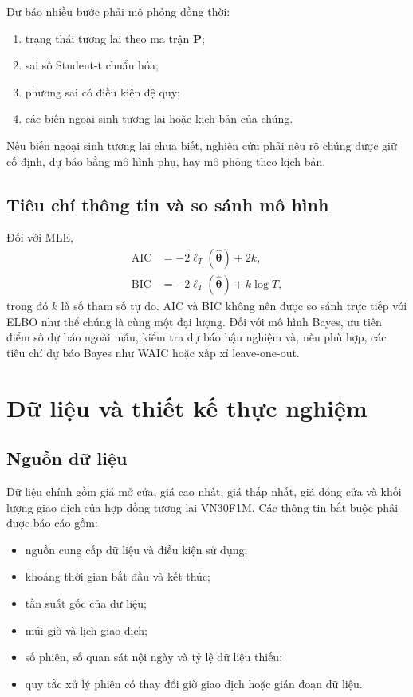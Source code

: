 \documentclass[12pt,a4paper]{article}
\numberwithin{equation}{section}
\newcommand{\bm}[1]{\symbf{#1}}
\newcommand{\Param}{\bm{\theta}}
\newcommand{\Pmat}{\bm{P}}
\newcommand{\AIC}{\operatorname{AIC}}
\newcommand{\BIC}{\operatorname{BIC}}
\begin{document}
Dự báo nhiều bước phải mô phỏng đồng thời:
\begin{enumerate}
  \item trạng thái tương lai theo ma trận $\Pmat$;
  \item sai số Student-t chuẩn hóa;
  \item phương sai có điều kiện đệ quy;
  \item các biến ngoại sinh tương lai hoặc kịch bản của chúng.
\end{enumerate}
Nếu biến ngoại sinh tương lai chưa biết, nghiên cứu phải nêu rõ chúng được giữ cố định, dự báo bằng mô hình phụ, hay mô phỏng theo kịch bản.

\subsection{Tiêu chí thông tin và so sánh mô hình}\label{subsec:model-selection}

Đối với MLE,
\begin{align}
  \AIC &= -2\ell_T(\widehat{\Param})+2k,
  \label{eq:aic}\\
  \BIC &= -2\ell_T(\widehat{\Param})+k\log T,
  \label{eq:bic}
\end{align}
trong đó $k$ là số tham số tự do. AIC và BIC không nên được so sánh trực tiếp với ELBO như thể chúng là cùng một đại lượng. Đối với mô hình Bayes, ưu tiên điểm số dự báo ngoài mẫu, kiểm tra dự báo hậu nghiệm và, nếu phù hợp, các tiêu chí dự báo Bayes như WAIC hoặc xấp xỉ leave-one-out.

\section{Dữ liệu và thiết kế thực nghiệm}\label{sec:du-lieu}

\subsection{Nguồn dữ liệu}\label{subsec:data-source}

Dữ liệu chính gồm giá mở cửa, giá cao nhất, giá thấp nhất, giá đóng cửa và khối lượng giao dịch của hợp đồng tương lai VN30F1M. Các thông tin bắt buộc phải được báo cáo gồm:
\begin{itemize}
  \item nguồn cung cấp dữ liệu và điều kiện sử dụng;
  \item khoảng thời gian bắt đầu và kết thúc;
  \item tần suất gốc của dữ liệu;
  \item múi giờ và lịch giao dịch;
  \item số phiên, số quan sát nội ngày và tỷ lệ dữ liệu thiếu;
  \item quy tắc xử lý phiên có thay đổi giờ giao dịch hoặc gián đoạn dữ liệu.
\end{itemize}
\end{document}
